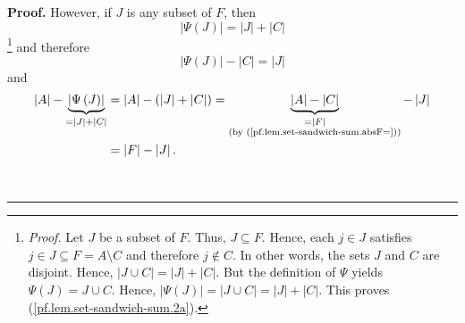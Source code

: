 \documentclass[numbers=enddot,12pt,final,onecolumn,notitlepage]{scrartcl}%
\theoremstyle{definition}
\newenvironment{proof}[1][Proof]{\noindent\textbf{#1.} }{\ \rule{0.5em}{0.5em}}
\newenvironment{verlong}{}{}
\begin{document}
\begin{verlong}
\begin{proof}
However, if $J$ is any subset of $F$, then%
\begin{equation}
\left\vert \Psi\left(  J\right)  \right\vert =\left\vert J\right\vert
+\left\vert C\right\vert \label{pf.lem.set-sandwich-sum.2a}%
\end{equation}
\footnote{\textit{Proof.} Let $J$ be a subset of $F$. Thus, $J\subseteq F$.
Hence, each $j\in J$ satisfies $j\in J\subseteq F=A\setminus C$ and therefore
$j\notin C$. In other words, the sets $J$ and $C$ are disjoint. Hence,
$\left\vert J\cup C\right\vert =\left\vert J\right\vert +\left\vert
C\right\vert $. But the definition of $\Psi$ yields $\Psi\left(  J\right)
=J\cup C$. Hence, $\left\vert \Psi\left(  J\right)  \right\vert =\left\vert
J\cup C\right\vert =\left\vert J\right\vert +\left\vert C\right\vert $. This
proves (\ref{pf.lem.set-sandwich-sum.2a}).} and therefore%
\begin{equation}
\left\vert \Psi\left(  J\right)  \right\vert -\left\vert C\right\vert
=\left\vert J\right\vert \label{pf.lem.set-sandwich-sum.2b}%
\end{equation}
and%
\begin{align}
\left\vert A\right\vert -\underbrace{\left\vert \Psi\left(  J\right)
\right\vert }_{=\left\vert J\right\vert +\left\vert C\right\vert }  &
=\left\vert A\right\vert -\left(  \left\vert J\right\vert +\left\vert
C\right\vert \right)  =\underbrace{\left\vert A\right\vert -\left\vert
C\right\vert }_{\substack{=\left\vert F\right\vert \\\text{(by
(\ref{pf.lem.set-sandwich-sum.absF=}))}}}-\left\vert J\right\vert \nonumber\\
&  =\left\vert F\right\vert -\left\vert J\right\vert .
\label{pf.lem.set-sandwich-sum.2c}%
\end{align}



\end{proof}
\end{verlong}
\end{document}
